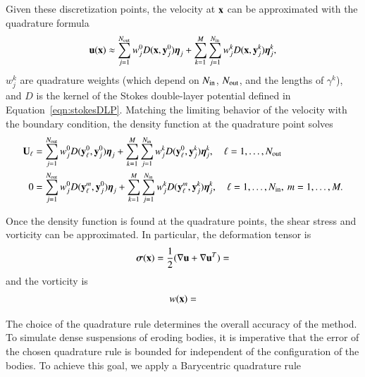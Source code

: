\documentclass[preprint, 10pt]{elsarticle}
\begin{document}
Given these discretization points, the velocity at ${\mathbf{x}}$ can be
approximated with the quadrature formula
\begin{align}
  \label{eqn:trap}
  {\mathbf{u}}({\mathbf{x}}) \approx \sum_{j=1}^{N_{\mathrm{out}}} w^0_j D({\mathbf{x}},{\mathbf{y}}^0_j) {\boldsymbol\eta}_j +
  \sum_{k=1}^M \sum_{j=1}^{N_{\mathrm{in}}} w^k_j D({\mathbf{x}},{\mathbf{y}}^k_j) {\boldsymbol\eta}^k_j,
\end{align}
$w^k_j$ are quadrature weights (which depend on $N_{\mathrm{in}}$, $N_{\mathrm{out}}$, and
the lengths of $\gamma^k$), and $D$ is the kernel of the Stokes
double-layer potential defined in Equation~\eqref{eqn:stokesDLP}.
Matching the limiting behavior of the velocity with the boundary
condition, the density function at the quadrature point solves
\begin{align}
  {\mathbf{U}}_\ell &= \sum_{j=1}^{N_{\mathrm{out}}} 
    w^0_j D({\mathbf{y}}^0_\ell,{\mathbf{y}}^0_j) {\boldsymbol\eta}_j +
  \sum_{k=1}^M \sum_{j=1}^{N_{\mathrm{in}}}
    w^k_j D({\mathbf{y}}^0_\ell,{\mathbf{y}}^k_j) {\boldsymbol\eta}^k_j, 
    \quad \ell = 1,\ldots,N_{\mathrm{out}} \\
  0 &= \sum_{j=1}^{N_{\mathrm{out}}} 
    w^0_j D({\mathbf{y}}^m_\ell,{\mathbf{y}}^0_j) {\boldsymbol\eta}_j +
  \sum_{k=1}^M \sum_{j=1}^{N_{\mathrm{in}}} 
    w^k_j D({\mathbf{y}}^m_\ell,{\mathbf{y}}^k_j) {\boldsymbol\eta}^k_j, 
    \quad \ell = 1,\ldots,N_{\mathrm{in}}, \: m=1,\ldots,M. 
\end{align}

Once the density function is found at the quadrature points, the shear
stress and vorticity can be approximated.  In particular,
the deformation tensor is
\begin{align}
  {\boldsymbol\sigma}({\mathbf{x}}) = \frac{1}{2}(\nabla {\mathbf{u}} + \nabla {\mathbf{u}}^T) = 
\end{align}
and the vorticity is
\begin{align}
  w({\mathbf{x}}) = 
\end{align}

The choice of the quadrature rule determines the overall accuracy of the
method.  To simulate dense suspensions of eroding bodies, it is
imperative that the error of the chosen quadrature rule is bounded for
independent of the configuration of the bodies.  To achieve this goal,
we apply a Barycentric quadrature rule

\end{document}
